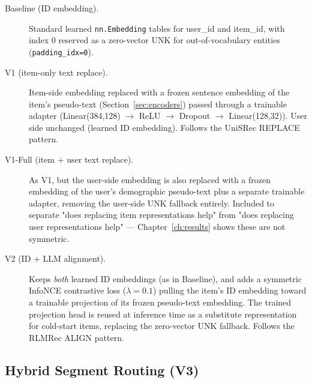 \begin{description}
  \item[Baseline (ID embedding).] Standard learned \texttt{nn.Embedding} tables for user\_id and item\_id, with index 0 reserved as a zero-vector UNK for out-of-vocabulary entities (\texttt{padding\_idx=0}).
  \item[V1 (item-only text replace).] Item-side embedding replaced with a frozen sentence embedding of the item's pseudo-text (Section~\ref{sec:encoders}) passed through a trainable adapter (Linear(384,128) $\to$ ReLU $\to$ Dropout $\to$ Linear(128,32)). User side unchanged (learned ID embedding). Follows the UniSRec \cite{hou2022unisrec} REPLACE pattern.
  \item[V1-Full (item + user text replace).] As V1, but the user-side embedding is also replaced with a frozen embedding of the user's demographic pseudo-text plus a separate trainable adapter, removing the user-side UNK fallback entirely. Included to separate "does replacing item representations help" from "does replacing user representations help" — Chapter~\ref{ch:results} shows these are not symmetric.
  \item[V2 (ID + LLM alignment).] Keeps \emph{both} learned ID embeddings (as in Baseline), and adds a symmetric InfoNCE contrastive loss ($\lambda = 0.1$) pulling the item's ID embedding toward a trainable projection of its frozen pseudo-text embedding. The trained projection head is reused at inference time as a substitute representation for cold-start items, replacing the zero-vector UNK fallback. Follows the RLMRec \cite{ren2024rlmrec} ALIGN pattern.
\end{description}

\subsection{Hybrid Segment Routing (V3)}
\label{sec:v3}

